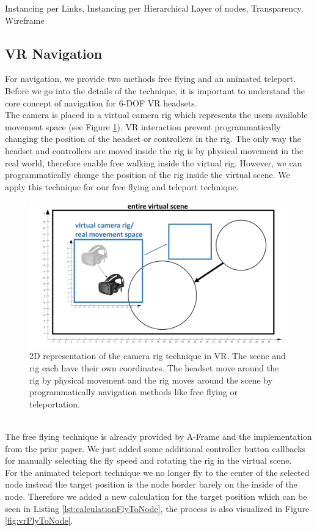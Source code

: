 Instancing per Links, 
Instancing per Hierarchical Layer of nodes, 
Transparency,
Wireframe

\subsection{VR Navigation}
\label{sec:vrInteractions}

For navigation, we provide two methods free flying and an animated teleport.
Before we go into the details of the technique, it is important to understand the core concept of navigation for 6-DOF VR headsets.\\
The camera is placed in a virtual camera rig which represents the users available movement space (see Figure \ref{fig:vrCameraRig}). 
VR interaction prevent programmatically changing the position of the headset or controllers in the rig. 
The only way the headset and controllers are moved inside the rig is by physical movement in the real world, therefore enable free walking inside the virtual rig.
However, we can programmatically change the position of the rig inside the virtual scene. 
We apply this technique for our free flying and teleport technique.
\begin{figure}[h]
    \centering
    \includegraphics[width=1\textwidth]{graphics/vrCameraRig.jpg}
    \caption{2D representation of the camera rig technique in VR. The scene and rig each have their own coordinates. The headset move around the rig by physical movement and the rig moves around the scene by programmatically navigation methods like free flying or teleportation.} 
    \label{fig:vrCameraRig} 
\end{figure}
\\
The free flying technique is already provided by A-Frame and the implementation from the prior paper.
We just added some additional controller button callbacks for manually selecting the fly speed and rotating the rig in the virtual scene.\\
For the animated teleport technique we no longer fly to the center of the selected node instead the target position is the node border barely on the inside of the node. Therefore we added a new calculation for the target position which can be seen in Listing \ref{lst:calculationFlyToNode}, the process is also visualized in Figure \ref{fig:vrFlyToNode}.


